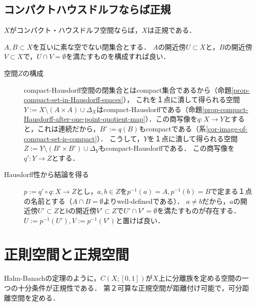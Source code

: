 \documentclass[uplatex,dvipdfmx]{jsreport}
\begin{document}
\subsection{コンパクトハウスドルフならば正規}

\begin{corollary}\label{cor-compact-Hausdorff-space-is-normal}
    $X$がコンパクト・ハウスドルフ空間ならば，$X$は正規である．
\end{corollary}
\begin{Proof}
    $A,B\subset X$を互いに素な空でない閉集合とする．
    $A$の開近傍$U\subset X$と，$B$の開近傍$V\subset X$で，$U\cap V=\emptyset$を満たすものを構成すれば良い．
    \begin{description}
        \item[空間$Z$の構成] 
        compact-Hausdorff空間の閉集合とはcompact集合であるから（命題\ref{prop-compact-set-in-Hausdorff-spaces}），
        これを１点に潰して得られる空間$Y:=X\setminus(A\times A)\cup\Delta_X$はcompact-Hausdorffである（命題\ref{prop-compact-Hausdorff-after-one-point-quotient-map}）．この商写像を$q:X\to Y$とすると，これは連続だから，$B':=q(B)$もcompactである（系\ref{cor-image-of-compact-set-is-compact}）．
        こうして，$Y$を１点に潰して得られる空間$Z:=Y\setminus(B'\times B')\cup\Delta_Y$もcompact-Hausdorffである．
        この商写像を$q':Y\to Z$とする．
        \item[Hausdorff性から結論を得る]
        $p:=q'\circ q:X\to Z$とし，$a,b\in Z$を$p^{-1}(a)=A,p^{-1}(b)=B$で定まる１点の名前とする（$A\cap B=\emptyset$よりwell-definedである）．
        $a\ne b$だから，$a$の開近傍$U'\subset Z$と$b$の開近傍$V'\subset Z$で$U'\cap V'=\emptyset$を満たすものが存在する．
        $U:=p^{-1}(U'),V:=p^{-1}(V')$と置けば良い．
    \end{description}
\end{Proof}

\section{正則空間と正規空間}

\begin{tcolorbox}[colframe=ForestGreen, colback=ForestGreen!10!white,breakable,colbacktitle=ForestGreen!40!white,coltitle=black,fonttitle=\bfseries\sffamily,
title=]
    Hahn-Banachの定理のように，$C(X;[0,1])$が$X$上に分離族を定める空間の一つの十分条件が正規性である．
    第２可算な正規空間が距離付け可能で，可分距離空間を定める．
\end{tcolorbox}
\end{document}
